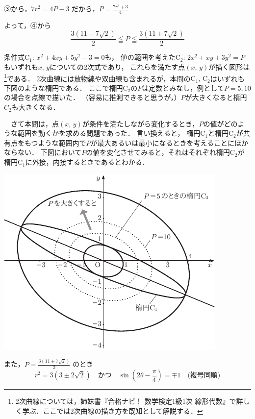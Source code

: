 \begin{解答}
③から，$7r^{2}=4P-3$ だから，\hspace{2zw}$P=\frac{7r^{2}+3}{4}$

よって，④から
\[
\frac{3(11-7\sqrt{2})}{2}\leqq P\leqq\frac{3(11+7\sqrt{2})}{2}\tag*{\kotae}
\]
\setcounter{footnote}{4}
{\footnotesize
\textbf{}\quad 条件式$\mathrm{C}_1: \, x^2+4xy+5y^2-3=0$も，
値の範囲を考えた$\mathrm{C}_2: \, 2x^2+xy+3y^2=P$もいずれも$x, \, y$についての2次式であり，
これらを満たす点$(x, \, y)$が描く図形は\footnote{2次曲線については，姉妹書『合格ナビ！ 数学検定1級1次 線形代数』で詳しく学ぶ．ここでは2次曲線の描き方を既知として解説する．}である．
2次曲線には放物線や双曲線も含まれるが，本問の$\mathrm{C}_1, \, \mathrm{C}_2$はいずれも下図のような楕円である．
ここで楕円$\mathrm{C}_2$の$P$は定数とみなし，例として$P=5, 10$の場合を点線で描いた．
（容易に推測できると思うが，）$P$が大きくなると楕円$C_2$も大きくなる．

　さて本問は，点$(x, \, y)$が条件を満たしながら変化するとき，$P$の値がどのような範囲を動くかを求める問題であった．
言い換えると，
楕円$\mathrm{C}_1$と楕円$\mathrm{C}_2$が共有点をもつような範囲内で$P$が最大あるいは最小になるときを考えることにほかならない．
下図において$P$の値を変化させてみると，それはそれぞれ楕円$\mathrm{C}_2$が楕円$\mathrm{C}_1$に外接，内接するときであるとわかる．
\begin{center}
\includegraphics[scale=1]{./fig/sec00_betsu02.pdf}
\end{center}

また，\hspace{1zw}$P=\frac{3(11\pm 7\sqrt{2})}{2}$ のとき
\[
r^{2}=3(3\pm 2\sqrt{2}) \quad  \text{かつ} \quad  \sin\left(2\theta-\frac{\pi}{4}\right)=\mp 1\quad \text{(複号同順)}
\]\par}
\end{解答}
